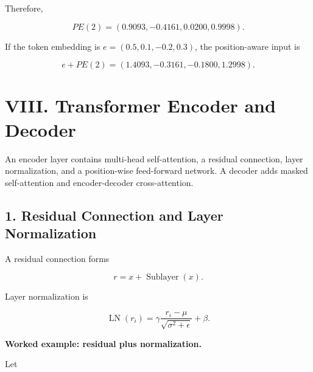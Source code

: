 \documentclass[11pt,a4paper,twoside]{article}
\begin{document}
Therefore,

\[
\boxed{PE(2)=(0.9093,-0.4161,0.0200,0.9998).}
\]

If the token embedding is $e=(0.5,0.1,-0.2,0.3)$, the position-aware input is

\[
e+PE(2)=(1.4093,-0.3161,-0.1800,1.2998).
\]

\section*{VIII. Transformer Encoder and Decoder}

An encoder layer contains multi-head self-attention, a residual connection, layer normalization, and a position-wise feed-forward network. A decoder adds masked self-attention and encoder-decoder cross-attention.

\begin{center}
\end{center}

\subsection*{1. Residual Connection and Layer Normalization}

A residual connection forms

\[
r=x+\operatorname{Sublayer}(x).
\]

Layer normalization is

\[
\boxed{
\operatorname{LN}(r_i)
=\gamma\frac{r_i-\mu}{\sqrt{\sigma^2+\epsilon}}+\beta
}.
\]

\textbf{Worked example: residual plus normalization.}

Let
\end{document}
